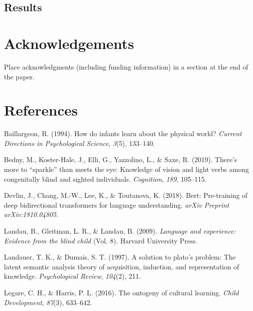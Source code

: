 \documentclass[10pt, letterpaper]{article}
\begin{document}
\hypertarget{results}{%
\subsection{Results}\label{results}}

\hypertarget{acknowledgements}{%
\section{Acknowledgements}\label{acknowledgements}}

Place acknowledgments (including funding information) in a section at
the end of the paper.

\hypertarget{references}{%
\section{References}\label{references}}

\setlength{\parindent}{-0.1in} 
\setlength{\leftskip}{0.125in}

\noindent

\hypertarget{refs}{}
\leavevmode\hypertarget{ref-baillargeon1994}{}%
Baillargeon, R. (1994). How do infants learn about the physical world?
\emph{Current Directions in Psychological Science}, \emph{3}(5),
133--140.

\leavevmode\hypertarget{ref-bedny2019}{}%
Bedny, M., Koster-Hale, J., Elli, G., Yazzolino, L., \& Saxe, R. (2019).
There's more to ``sparkle'' than meets the eye: Knowledge of vision and
light verbs among congenitally blind and sighted individuals.
\emph{Cognition}, \emph{189}, 105--115.

\leavevmode\hypertarget{ref-devlin2018}{}%
Devlin, J., Chang, M.-W., Lee, K., \& Toutanova, K. (2018). Bert:
Pre-training of deep bidirectional transformers for language
understanding. \emph{arXiv Preprint arXiv:1810.04805}.

\leavevmode\hypertarget{ref-landau2009}{}%
Landau, B., Gleitman, L. R., \& Landau, B. (2009). \emph{Language and
experience: Evidence from the blind child} (Vol. 8). Harvard University
Press.

\leavevmode\hypertarget{ref-landauer1997}{}%
Landauer, T. K., \& Dumais, S. T. (1997). A solution to plato's problem:
The latent semantic analysis theory of acquisition, induction, and
representation of knowledge. \emph{Psychological Review}, \emph{104}(2),
211.

\leavevmode\hypertarget{ref-legare2016}{}%
Legare, C. H., \& Harris, P. L. (2016). The ontogeny of cultural
learning. \emph{Child Development}, \emph{87}(3), 633--642.
\end{document}
